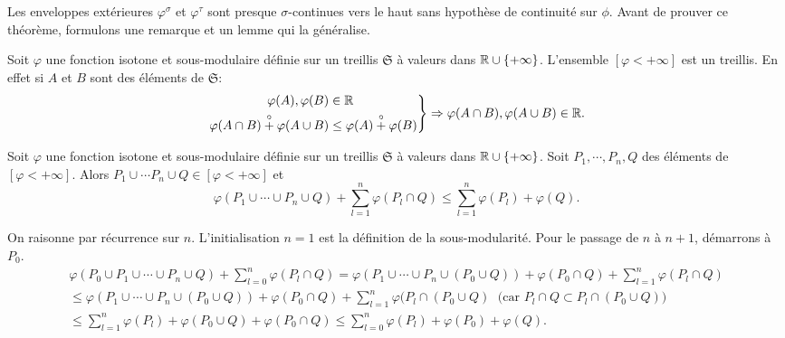 Les enveloppes extérieures $\varphi^\sigma$ et $\varphi^\tau$ sont presque $\sigma$-continues vers le haut sans hypothèse de continuité sur $\phi$. Avant de prouver ce théorème, formulons une remarque et un lemme qui la généralise.
\begin{rem}
 Soit $\varphi$ une fonction isotone et sous-modulaire définie sur un treillis $\mathfrak{S}$ à valeurs dans $\mathbb{R}\cup \left\lbrace + \infty \right\rbrace$. L'ensemble $[ \varphi < + \infty]$ est un treillis.\newline
 En effet si $A$ et $B$ sont des éléments de $\mathfrak{S}$:
 \begin{displaymath}
  \left.
    \begin{aligned}
       \varphi(A), \varphi(B) &\in \mathbb{R} \\
       \varphi(A \cap B) \overset{\circ}{+} \varphi(A \cup B) &\leq \varphi(A) \overset{\circ}{+} \varphi(B)
    \end{aligned}
  \right\rbrace
  \Rightarrow
  \varphi(A \cap B), \varphi(A \cup B) \in \mathbb{R}.
 \end{displaymath}
\end{rem}

\begin{lemn}\label{Lemm:InegSousModul}
  Soit $\varphi$ une fonction isotone et sous-modulaire définie sur un treillis $\mathfrak{S}$ à valeurs dans $\mathbb{R}\cup \left\lbrace + \infty \right\rbrace$. Soit $P_1, \cdots, P_n,Q$ des éléments de $[ \varphi < + \infty]$. Alors $P_1 \cup \cdots P_n \cup Q \in [ \varphi < + \infty]$ et
  \begin{displaymath}
   \varphi(P_1 \cup \cdots \cup P_n \cup Q) + \sum_{l=1}^n\varphi(P_l \cap Q) \leq
   \sum_{l=1}^n\varphi(P_l)  + \varphi(Q).
  \end{displaymath}
\end{lemn}
\begin{demo}
 On raisonne par récurrence sur $n$. L'initialisation $n=1$ est la définition de la sous-modularité. Pour le passage de $n$ à $n+1$, démarrons à $P_0$.
 \begin{multline*}
  \varphi(P_0 \cup P_1 \cup \cdots \cup P_n \cup Q) + \sum_{l=0}^n\varphi(P_l \cap Q) =
  \varphi\left(P_1 \cup \cdots \cup P_n \cup (P_0 \cup Q)\right) + \varphi(P_0 \cap Q) + \sum_{l=1}^n \varphi(P_l \cap Q) \\
  \leq \varphi\left(P_1 \cup \cdots \cup P_n \cup (P_0 \cup Q)\right) + \varphi(P_0 \cap Q) + \sum_{l=1}^n \varphi(P_l \cap (P_0 \cup Q)  \;\text{ (car $P_l \cap Q \subset P_l \cap (P_0 \cup Q)$)}\\
  \leq \sum_{l=1}^n\varphi(P_l) + \varphi(P_0 \cup Q) + \varphi(P_0 \cap Q)
  \leq \sum_{l=0}^n\varphi(P_l) + \varphi(P_0) + \varphi(Q).
 \end{multline*}
\end{demo}

